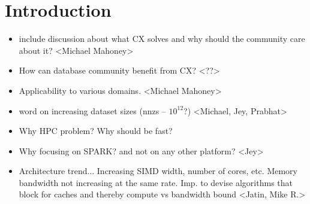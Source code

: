 \section{Introduction}
\begin{itemize}

\item include discussion about what CX solves and why should the community care about it? <Michael Mahoney>

\item How can database community benefit from CX? <??>

\item Applicability to various domains. <Michael Mahoney>

\item word on increasing dataset sizes (nnzs -- $10^{12}$?)  <Michael, Jey, Prabhat>
 \item Why HPC problem? Why should be fast?

\item Why focusing on SPARK? and not on any other platform? <Jey>

\item Architecture trend... Increasing SIMD width, number of cores, etc. Memory bandwidth not increasing at the same rate. Imp. to devise algorithms that block for caches and thereby compute vs bandwidth bound <Jatin, Mike R.>
    
\end{itemize}
